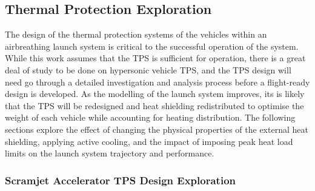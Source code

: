 \subsection{Thermal Protection Exploration}

The design of the thermal protection systems of the vehicles within an airbreathing launch system is critical to the successful operation of the system. While this work assumes that the TPS is sufficient for operation, there is a great deal of study to be done on hypersonic vehicle TPS, and the TPS design will need go through a detailed investigation and analysis process before a flight-ready design is developed. 
As the modelling of the launch system improves, its is likely that the TPS will be redesigned and heat shielding redistributed to optimise the weight of each vehicle while accounting for heating distribution. The following sections explore the effect of changing the physical properties of the external heat shielding, applying active cooling, and the impact of imposing peak heat load limits on the launch system trajectory and performance. 

\subsubsection{Scramjet Accelerator TPS Design Exploration}

